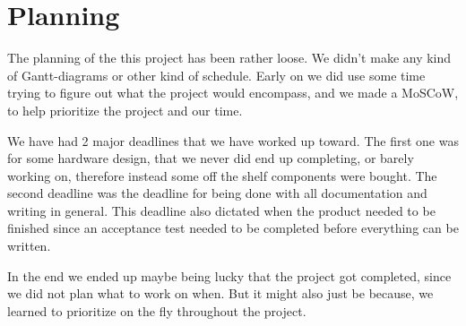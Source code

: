 \chapter{Planning}
The planning of the this project has been rather loose. We didn't make any kind of Gantt-diagrams or other kind of schedule. Early on we did use some time trying to figure out what the project would encompass, and we made a MoSCoW, to help prioritize the project and our time.

We have had 2 major deadlines that we have worked up toward. The first one was for some hardware design, that we never did end up completing, or barely working on, therefore instead some off the shelf components were bought. The second deadline was the deadline for being done with all documentation and writing in general. This deadline also dictated when the product needed to be finished since an acceptance test needed to be completed before everything can be written. 

In the end we ended up maybe being lucky that the project got completed, since we did not plan what to work on when. But it might also just be because, we learned to prioritize on the fly throughout the project. 